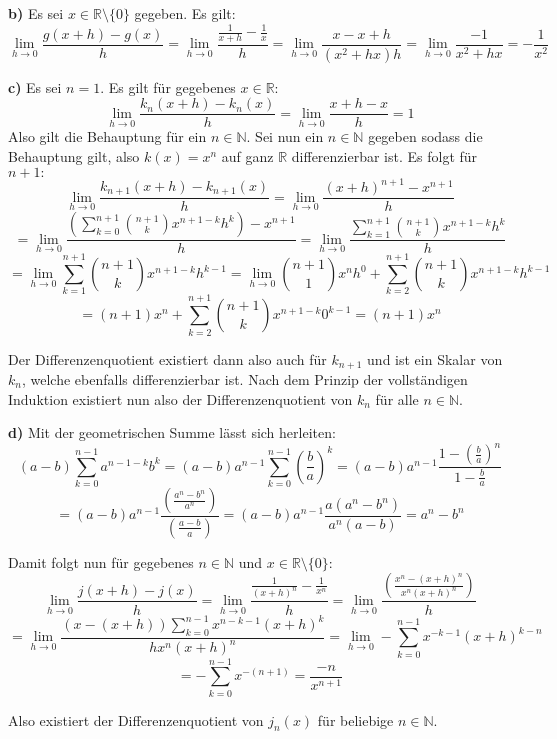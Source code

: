 \documentclass[a4paper,graphics,11pt]{article}
\begin{document}
\textbf{b)}
Es sei $x \in \mathbb{R}\setminus \{0\}$ gegeben. Es gilt:
$$
    \lim_{h \to 0} \frac{g(x+h)-g(x)}{h}
    = \lim_{h \to 0} \frac{\frac{1}{x+h} - \frac{1}{x}}{h}
    = \lim_{h \to 0} \frac{x-x+h}{(x^2+hx)h}
    = \lim_{h \to 0} \frac{-1}{x^2+hx}
    = -\frac{1}{x^2}
$$
\newpage

\textbf{c)}
Es sei $n=1$. Es gilt für gegebenes $x \in \mathbb{R}\colon$
$$
    \lim_{h \to 0} \frac{k_n(x+h)-k_n(x)}{h}
    = \lim_{h \to 0} \frac{x+h-x}{h}
    = 1
$$
Also gilt die Behauptung für ein $n \in \mathbb{N}$.
Sei nun ein $n \in \mathbb{N}$ gegeben sodass die Behauptung gilt, also $k(x) = x^n$ auf ganz $\mathbb{R}$
differenzierbar ist. Es folgt für $n+1\colon$
$$
    \lim_{h \to 0} \frac{k_{n+1}(x+h)-k_{n+1}(x)}{h}
    = \lim_{h \to 0} \frac{(x+h)^{n+1}-x^{n+1}}{h}
$$$$
    = \lim_{h \to 0} \frac{\displaystyle\left(\sum_{k=0}^{n+1}\binom{n+1}{k}x^{n+1-k}h^k\right)-x^{n+1}}{h}
    = \lim_{h \to 0} \frac{\displaystyle\sum_{k=1}^{n+1}\binom{n+1}{k}x^{n+1-k}h^k}{h}
$$$$
    = \lim_{h \to 0} \sum_{k=1}^{n+1}\binom{n+1}{k}x^{n+1-k}h^{k-1}
    = \lim_{h \to 0} \binom{n+1}{1}x^{n}h^0+\sum_{k=2}^{n+1} \binom{n+1}{k}x^{n+1-k}h^{k-1}
$$$$
    = (n+1)x^n + \sum_{k=2}^{n+1} \binom{n+1}{k}x^{n+1-k}0^{k-1}
    = (n+1)x^n
$$

Der Differenzenquotient existiert dann also auch für $k_{n+1}$ und ist ein Skalar von $k_n$, welche
ebenfalls differenzierbar ist.
Nach dem Prinzip der vollständigen Induktion existiert nun also der Differenzenquotient von $k_n$ für
alle $n \in \mathbb{N}$.

\textbf{d)}
Mit der geometrischen Summe lässt sich herleiten:
$$
    (a-b)\sum_{k=0}^{n-1} a^{n-1-k}b^k
    = (a-b)a^{n-1}\sum_{k=0}^{n-1} \left(\frac{b}{a}\right)^k
    = (a-b)a^{n-1}\frac{1-\left(\frac{b}{a}\right)^n}{1-\frac{b}{a}}
$$$$
    = (a-b)a^{n-1} \frac{\left(\frac{a^n-b^n}{a^n}\right)}{\left(\frac{a-b}{a}\right)}
    = (a-b)a^{n-1} \frac{a(a^n-b^n)}{a^n(a-b)} = a^n-b^n
$$

Damit folgt nun für gegebenes $n \in \mathbb{N}$ und $x \in \mathbb{R}\setminus \{0\}\colon$
$$
    \lim_{h \to 0} \frac{j(x+h)-j(x)}{h}
    = \lim_{h \to 0} \frac{\frac{1}{(x+h)^n} - \frac{1}{x^n}}{h}
    = \lim_{h \to 0} \frac{\left(\frac{x^n-(x+h)^n}{x^n(x+h)^n}\right)}{h}
$$$$
    = \lim_{h \to 0} \frac{(x-(x+h))\sum_{k=0}^{n-1} x^{n-k-1}(x+h)^k}{hx^n(x+h)^n} 
    = \lim_{h \to 0} -\sum_{k=0}^{n-1} x^{-k-1}(x+h)^{k-n}
$$$$
    = -\sum_{k=0}^{n-1} x^{-(n+1)} = \frac{-n}{x^{n+1}}
$$

Also existiert der Differenzenquotient von $j_n(x)$ für beliebige $n \in \mathbb{N}$.
\end{document}
